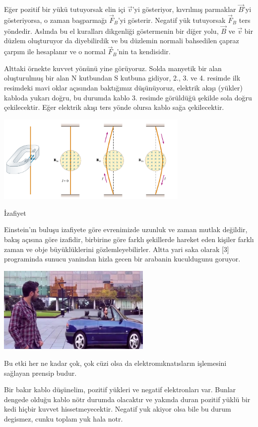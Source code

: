 \documentclass[12pt,fleqn]{article}\usepackage{../../common}
\begin{document}
Eğer pozitif bir yükü tutuyorsak elin içi $\vec{v}$'yi gösteriyor, kıvrılmış
parmaklar $\vec{B}$'yi gösteriyorsa, o zaman başparmağı $\vec{F}_B$'yi
gösterir. Negatif yük tutuyorsak $\vec{F}_B$ ters yöndedir. Aslında bu el
kuralları dikgenliği göstermenin bir diğer yolu, $\vec{B}$ ve $\vec{v}$ bir
düzlem oluşturuyor da diyebilirdik ve bu düzlemin normali bahsedilen çapraz
çarpım ile hesaplanır ve o normal $\vec{F}_B$'nin ta kendisidir.

Alttaki örnekte kuvvet yönünü yine görüyoruz. Solda manyetik bir alan
oluşturulmuş bir alan N kutbundan S kutbuna gidiyor, 2., 3. ve 4. resimde ilk
resimdeki mavi oklar açısından baktığımız düşünüyoruz, elektrik akışı (yükler)
kabloda yukarı doğru, bu durumda kablo 3. resimde görüldüğü şekilde sola doğru
çekilecektir. Eğer elektrik akışı ters yönde olursa kablo sağa çekilecektir.

\includegraphics[width=25em]{19_02.png}

İzafiyet                       

Einstein'ın buluşu izafiyete göre evrenimizde uzunluk ve zaman mutlak değildir,
bakış açısına göre izafidir, birbirine göre farklı şekillerde hareket eden
kişiler farklı zaman ve obje büyüklüklerini gözlemleyebilirler. Altta yari saka
olarak [3] programinda sunucu yanindan hizla gecen bir arabanin kuculdugunu
goruyor. 

\includegraphics[width=20em]{19_03.jpg}

Bu etki her ne kadar çok, çok cüzi olsa da elektromıknatısların işlemesini
sağlayan prensip budur.

Bir bakır kablo düşünelim, pozitif yükleri ve negatif elektronları var. Bunlar
dengede olduğu kablo nötr durumda olacaktır ve yakında duran pozitif yüklü bir
kedi hiçbir kuvvet hissetmeyecektir. Negatif yuk akiyor olsa bile bu durum
degismez, cunku toplam yuk hala notr. 
\end{document}
